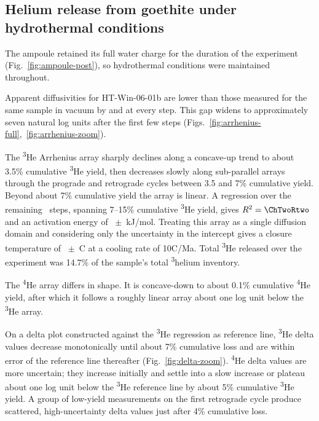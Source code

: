 \clearpage


\clearpage

\subsection{Helium release from goethite under hydrothermal conditions}\label{sec:results-goethite}

The ampoule retained its full water charge for the duration of the experiment (Fig.~\ref{fig:ampoule-post}), so hydrothermal conditions were maintained throughout.

Apparent diffusivities for HT-Win-06-01b are lower than those measured for the same sample in vacuum by \citet{monteiro2017} and \citet{farley2024} at every step. This gap widens to approximately seven natural log units after the first few steps (Figs.~\ref{fig:arrhenius-full},~\ref{fig:arrhenius-zoom}).

The \textsuperscript{3}He Arrhenius array sharply declines along a concave-up trend to about 3.5\% cumulative \textsuperscript{3}He yield, then decreases slowly along sub-parallel arrays through the prograde and retrograde cycles between 3.5 and 7\% cumulative yield. Beyond about 7\% cumulative yield the array is linear. A regression over the remaining \ChTwoN\ steps, spanning 7--15\% cumulative \textsuperscript{3}He yield, gives $R^{2} = \ChTwoRtwo$ and an activation energy of \ChTwoEa\ $\pm$ \ChTwoEaErr\,kJ/mol. Treating this array as a single diffusion domain and considering only the uncertainty in the intercept gives a closure temperature of \ChTwoTc\ $\pm$ \ChTwoTcErr\,\textdegree C at a cooling rate of 10\textdegree C/Ma. Total \textsuperscript{3}He released over the experiment was 14.7\% of the sample's total \textsuperscript{3}helium inventory.

The \textsuperscript{4}He array differs in shape. It is concave-down to about 0.1\% cumulative \textsuperscript{4}He yield, after which it follows a roughly linear array about one log unit below the \textsuperscript{3}He array.

On a delta plot constructed against the \textsuperscript{3}He regression as reference line, \textsuperscript{3}He delta values decrease monotonically until about 7\% cumulative loss and are within error of the reference line thereafter (Fig.~\ref{fig:delta-zoom}). \textsuperscript{4}He delta values are more uncertain; they increase initially and settle into a slow increase or plateau about one log unit below the \textsuperscript{3}He reference line by about 5\% cumulative \textsuperscript{3}He yield. A group of low-yield measurements on the first retrograde cycle produce scattered, high-uncertainty delta values just after 4\% cumulative loss.

